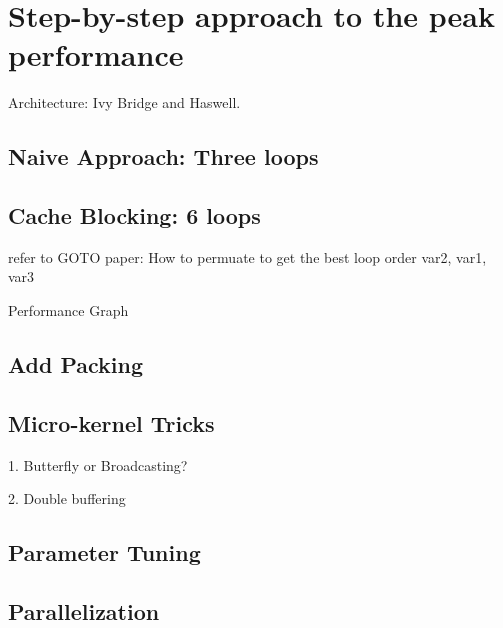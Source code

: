 
\section{Step-by-step approach to the peak performance}
Architecture: Ivy Bridge and Haswell.

\subsection{Naive Approach: Three loops}

\subsection{Cache Blocking: 6 loops}


refer to GOTO paper: How to permuate to get the best loop order
var2, var1, var3


Performance Graph

\subsection{Add Packing}


\subsection{Micro-kernel Tricks}
1. Butterfly or Broadcasting?

2. Double buffering


\subsection{Parameter Tuning}



\subsection{Parallelization}


